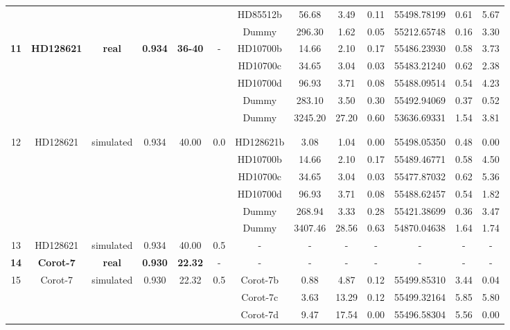 \documentclass{article}
\begin{document}
\begin{landscape}
\begin{longtable}{ccccccccccccc}
 & & & & & & HD85512b & 56.68 & 3.49 & 0.11 & 55498.78199 & 0.61 & 5.67 \\
 & & & & & & Dummy & 296.30 & 1.62 & 0.05 & 55212.65748 & 0.16 & 3.30 \\
\hline
\bf{11} & \bf{HD128621} & \bf{\bf{real}} & \bf{0.934} & \bf{36-40} & - & HD10700b & 14.66 & 2.10 & 0.17 & 55486.23930 & 0.58 & 3.73 \\
 & & & & & & HD10700c & 34.65 & 3.04 & 0.03 & 55483.21240 & 0.62 & 2.38 \\
 & & & & & & HD10700d & 96.93 & 3.71 & 0.08 & 55488.09514 & 0.54 & 4.23 \\
 & & & & & & Dummy & 283.10 & 3.50 & 0.30 & 55492.94069 & 0.37 & 0.52 \\
 & & & & & & Dummy & 3245.20 & 27.20 & 0.60 & 53636.69331 & 1.54 & 3.81 \\
 & & & &  & & & & & & & &\\
 & & & &  & & & & & & & &\\
12 & HD128621 & simulated & 0.934 & 40.00 & 0.0 & HD128621b & 3.08 & 1.04 & 0.00 & 55498.05350 & 0.48 & 0.00 \\
 & & & &  & & HD10700b & 14.66 & 2.10 & 0.17 & 55489.46771 & 0.58 & 4.50 \\
 & & & &  & & HD10700c & 34.65 & 3.04 & 0.03 & 55477.87032 & 0.62 & 5.36 \\
 & & & &  & & HD10700d & 96.93 & 3.71 & 0.08 & 55488.62457 & 0.54 & 1.82 \\
 & & & &  & & Dummy & 268.94 & 3.33 & 0.28 & 55421.38699 & 0.36 & 3.47 \\
 & & & &  & & Dummy & 3407.46 & 28.56 & 0.63 & 54870.04638 & 1.64 & 1.74 \\
\hline
13 & HD128621 & simulated & 0.934 & 40.00 & 0.5 & - & - & - & - & - & - & -\\
\hline
\bf{14} & \bf{Corot-7} & \bf{\bf{real}} & \bf{0.930} & \bf{22.32} & - & - & - & - & - & - & - & -\\
\hline
15 & Corot-7 & simulated & 0.930 & 22.32 & 0.5 & Corot-7b & 0.88 & 4.87 & 0.12 & 55499.85310 & 3.44 & 0.04 \\
 & & & &  & & Corot-7c & 3.63 & 13.29 & 0.12 & 55499.32164 & 5.85 & 5.80 \\
 & & & &  & & Corot-7d & 9.47 & 17.54 & 0.00 & 55496.58304 & 5.56 & 0.00 \\
\hline
\end{longtable}

\end{landscape}
\end{document}
